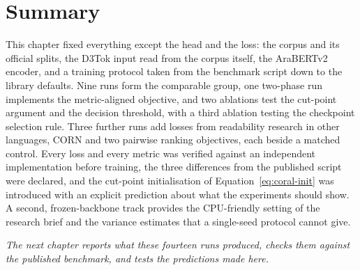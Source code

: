 \section{Summary}

This chapter fixed everything except the head and the loss: the corpus and its official splits,
the D3Tok input read from the corpus itself, the AraBERTv2 encoder, and a training protocol
taken from the benchmark script down to the library defaults. Nine runs form the comparable
group, one two-phase run implements the metric-aligned objective, and two ablations test the
cut-point argument and the decision threshold, with a third ablation testing the checkpoint
selection rule. Three further runs add losses from readability research in other languages,
CORN and two pairwise ranking objectives, each beside a matched control. Every loss and every metric was verified against an independent implementation
before training, the three differences from the published script were declared, and the
cut-point initialisation of Equation~\ref{eq:coral-init} was introduced with an explicit
prediction about what the experiments should show. A second, frozen-backbone track provides
the CPU-friendly setting of the research brief and the variance estimates that a single-seed
protocol cannot give.

\textit{The next chapter reports what these fourteen runs produced, checks them against the
published benchmark, and tests the predictions made here.}
